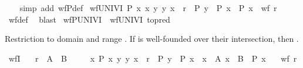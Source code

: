 \begin{isabellebody}
%
\isadelimproof
\ \ %
\endisadelimproof
%
\isatagproof
{}\isamarkupfalse%
\ {\isacharparenleft}{\kern0pt}simp\ add{\isacharcolon}{\kern0pt}\ wfP{\isacharunderscore}{\kern0pt}def{\isacharparenright}{\kern0pt}%
\endisatagproof
{\isafoldproof}%
%
\isadelimproof
\isanewline
%
\endisadelimproof
\isanewline
{}\isamarkupfalse%
\ wfUNIVI{\isacharcolon}{\kern0pt}\ {\isachardoublequoteopen}{\isacharparenleft}{\kern0pt}{\isasymAnd}P\ x{\isachardot}{\kern0pt}\ {\isacharparenleft}{\kern0pt}{\isasymforall}x{\isachardot}{\kern0pt}\ {\isacharparenleft}{\kern0pt}{\isasymforall}y{\isachardot}{\kern0pt}\ {\isacharparenleft}{\kern0pt}y{\isacharcomma}{\kern0pt}\ x{\isacharparenright}{\kern0pt}\ {\isasymin}\ r\ {\isasymlongrightarrow}\ P\ y{\isacharparenright}{\kern0pt}\ {\isasymlongrightarrow}\ P\ x{\isacharparenright}{\kern0pt}\ {\isasymLongrightarrow}\ P\ x{\isacharparenright}{\kern0pt}\ {\isasymLongrightarrow}\ wf\ r{\isachardoublequoteclose}\isanewline
%
\isadelimproof
\ \ %
\endisadelimproof
%
\isatagproof
{}\isamarkupfalse%
\ wf{\isacharunderscore}{\kern0pt}def\ \isamarkupfalse%
\ blast%
\endisatagproof
{\isafoldproof}%
%
\isadelimproof
\isanewline
%
\endisadelimproof
\isanewline
{}\isamarkupfalse%
\ wfPUNIVI\ {\isacharequal}{\kern0pt}\ wfUNIVI\ {\isacharbrackleft}{\kern0pt}to{\isacharunderscore}{\kern0pt}pred{\isacharbrackright}{\kern0pt}%
\begin{isamarkuptext}%
Restriction to domain  and range .
  If  is well-founded over their intersection, then .%
\end{isamarkuptext}\isamarkuptrue%
\isamarkupfalse%
\ wfI{\isacharcolon}{\kern0pt}\isanewline
\ \ \ {\isachardoublequoteopen}r\ {\isasymsubseteq}\ A\ {\isasymtimes}\ B{\isachardoublequoteclose}\isanewline
\ \ \ \ \ {\isachardoublequoteopen}{\isasymAnd}x\ P{\isachardot}{\kern0pt}\ {\isasymlbrakk}{\isasymforall}x{\isachardot}{\kern0pt}\ {\isacharparenleft}{\kern0pt}{\isasymforall}y{\isachardot}{\kern0pt}\ {\isacharparenleft}{\kern0pt}y{\isacharcomma}{\kern0pt}\ x{\isacharparenright}{\kern0pt}\ {\isasymin}\ r\ {\isasymlongrightarrow}\ P\ y{\isacharparenright}{\kern0pt}\ {\isasymlongrightarrow}\ P\ x{\isacharsemicolon}{\kern0pt}\ \ x\ {\isasymin}\ A{\isacharsemicolon}{\kern0pt}\ x\ {\isasymin}\ B{\isasymrbrakk}\ {\isasymLongrightarrow}\ P\ x{\isachardoublequoteclose}\isanewline
\ \ \ {\isachardoublequoteopen}wf\ r{\isachardoublequoteclose}\isanewline
%
\isadelimproof

\end{isabellebody}
